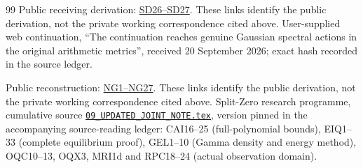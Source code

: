 \documentclass[11pt]{article}
\begin{document}
\begin{thebibliography}{99}
Public receiving derivation: \href{https://github.com/KokunoYumeto/zeta-function-research-reader/blob/689a8f87e9c12b7a99b01b3123438c6751ee608f/workbenches/splitzero-tandem/continuations/20260920-original-spectral-determinant/ORIGINAL_SPECTRAL_DETERMINANT.tex\#L471}{SD26--SD27}. These links identify the public derivation, not the private working correspondence cited above.
 User-supplied web continuation, ``The continuation reaches
genuine Gaussian spectral actions in the original arithmetic metrics'',
received 20 September 2026; exact hash recorded in the source ledger.

Public reconstruction: \href{https://github.com/KokunoYumeto/zeta-function-research-reader/blob/689a8f87e9c12b7a99b01b3123438c6751ee608f/workbenches/splitzero-tandem/continuations/20260920-gaussian-arithmetic-return/GAUSSIAN_ARITHMETIC_RETURN.tex\#L31}{NG1--NG27}. These links identify the public derivation, not the private working correspondence cited above.
 Split-Zero research programme, cumulative source
\href{https://github.com/KokunoYumeto/zeta-function-research-reader/blob/5992ad50c0f2a06921f1fcaded7b4e38097c0739/workbenches/splitzero-tandem/continuations/20260920-original-kernel-mixed-determinants/cumulative/09_UPDATED_JOINT_NOTE.tex\#L1}{\texttt{09\_UPDATED\_JOINT\_NOTE.tex}}, version pinned in the accompanying
source-reading ledger: CAI16--25 (full-polynomial bounds), EIQ1--33
(complete equilibrium proof), GEL1--10 (Gamma density and energy method),
OQC10--13, OQX3, MRI1d and RPC18--24 (actual observation domain).


\end{thebibliography}
\end{document}
